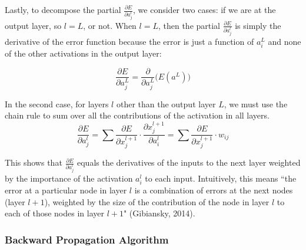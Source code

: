 Lastly, to decompose the partial $\frac {\partial E} {\partial a_j^l }$, we consider two cases: if we are at the output layer, so $l = L$, or not. When $l = L$, then the partial $\frac {\partial E} {\partial a_j^l }$ is simply the derivative of the error function because the error is just a function of $a_i^L$ and none of the other activations in the output layer: 

$$
\frac {\partial E} {\partial a_j^L } = \frac {\partial} {\partial a_j^L } \Big( E(a^L) \Big)
$$

In the second case, for layers $l$ other than the output layer $L$, we must use the chain rule to sum over all the contributions of the activation in all layers. 
$$
\frac {\partial E} {\partial a_j^l } = \sum \frac {\partial E} {\partial x_j^{l+1} } \cdot \frac {\partial x_j^{l+1}} {\partial a_i^l }
= \sum \frac {\partial E} {\partial x_j^{l+1} } \cdot w_{ij}
$$

This shows that $\frac {\partial E} {\partial a_j^l }$ equals the derivatives of the inputs to the next layer weighted by the importance of the activation $a_i^l$ to each input. Intuitively, this means ``the error at a particular node in layer $l$ is a combination of errors at the next nodes (layer $l+1$), weighted by the size of the contribution of the node in layer $l$ to each of those nodes in layer $l+1$" (Gibiansky, 2014). 

\subsubsection{Backward Propagation Algorithm}

